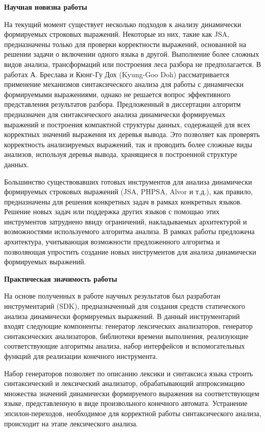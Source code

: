 \textbf{Научная новизна работы}

На текущий момент существует несколько подходов к анализу динамически формируемых строковых выражений. Некоторые из них, такие как JSA, предназначены только для проверки корректности выражений, основанной на решении задачи о включении одного языка в другой. Выполнение более сложных видов анализа, трансформаций или построения леса разбора не предполагается. В работах А. Бреслава и Кюнг-Гу Дох (Kyung-Goo Doh) рассматривается применение механизмов синтаксического анализа для работы с динамически формируемыми выражениями, однако не решается вопрос эффективного представления результатов разбора. Предложенный в диссертации алгоритм предназначен для синтаксического анализа динамически формируемых выражений и построения компактной структуры данных, содержащей для всех корректных значений выражения их деревья вывода. Это позволяет как проверять корректность анализируемых выражений, так и проводить более сложные виды анализов, используя деревья вывода, хранящиеся в построенной структуре данных.

Большинство существовавших готовых инструментов для анализа динамически формируемых строковых выражений (JSA, PHPSA, Alvor и т.д.), как правило, предназначены для решения конкретных задач в рамках конкретных языков. Решение новых задач или поддержка других языков с помощью этих инструментов затруднено ввиду ограничений, накладываемых архитектурой и возможностями используемого алгоритма анализа. В рамках работы предложена архитектура, учитывающая возможности предложенного алгоритма и позволяющая упростить создание новых инструментов для анализа динамически формируемых выражений.

\textbf{Практическая значимость работы}


На основе полученных в работе научных результатов был разработан инструментарий (SDK), предназначенный для создания средств статического анализа динамически формируемых выражений. В данный инструментарий входят следующие компоненты: генератор лексических анализаторов, генератор синтаксических анализаторов, библиотеки времени выполнения, реализующие соответствующие алгоритмы анализа, набор интерфейсов и вспомогательных функций для реализации конечного инструмента. 

Набор генераторов позволяет по описанию лексики и синтаксиса языка строить синтаксический и лексический анализатор, обрабатывающий аппроксимацию множества значений динамически формируемого выражения на соответствующем языке, представленную в виде произвольного конечного автомата. Устранение эпсилон-переходов, необходимое для корректной работы синтаксического анализа, происходит на этапе лексического анализа.

